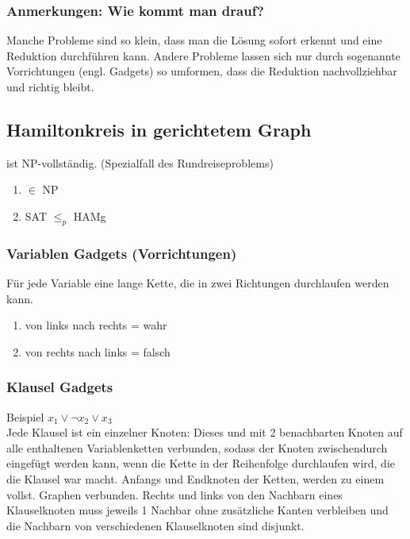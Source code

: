 \subsubsection{Anmerkungen: Wie kommt man drauf?}
Manche Probleme sind so klein, dass man die Lösung sofort erkennt und eine Reduktion durchführen kann. Andere Probleme lassen sich nur durch sogenannte Vorrichtungen (engl. Gadgets) so umformen, dass die Reduktion nachvollziehbar und richtig bleibt.
\subsection{Hamiltonkreis in gerichtetem Graph}
ist NP-vollständig. (Spezialfall des Rundreiseproblems)
\begin{enumerate}
\item $\in $ NP \checkmark
\item SAT $\leq_p$ HAMg
\end{enumerate}
\subsubsection{Variablen Gadgets (Vorrichtungen)}
Für jede Variable eine lange Kette, die in zwei Richtungen durchlaufen werden kann.
\begin{enumerate}
\item von links nach rechts = wahr
\item von rechts nach links = falsch
\end{enumerate}
\subsubsection{Klausel Gadgets}
Beispiel $x_1 \lor \lnot{x_2} \lor x_3$\\
Jede Klausel ist ein einzelner Knoten: Dieses und mit 2 benachbarten Knoten auf alle enthaltenen Variablenketten verbunden, sodass der Knoten zwischendurch eingefügt werden kann, wenn die Kette in der Reihenfolge durchlaufen wird, die die Klausel war macht. Anfangs und Endknoten der Ketten, werden zu einem vollst. Graphen verbunden. Rechts und links von den Nachbarn eines Klauselknoten muss jeweils 1 Nachbar ohne zusätzliche Kanten verbleiben und die Nachbarn von verschiedenen Klauselknoten sind disjunkt.\\
